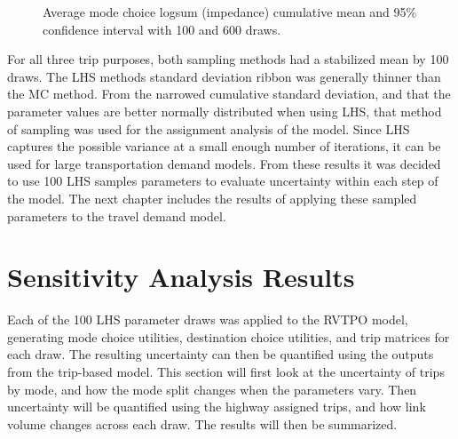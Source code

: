 \documentclass[
  futuretransp,
  submit,
  moreauthors,
]{Definitions/mdpi}
\begin{document}
\begin{figure}

\begin{minipage}{\linewidth}



\end{minipage}%
\newline
\begin{minipage}{\linewidth}



\end{minipage}%

\caption{\label{fig-cm}Average mode choice logsum (impedance) cumulative
mean and 95\% confidence interval with 100 and 600 draws.}

\end{figure}%

For all three trip purposes, both sampling methods had a stabilized mean
by 100 draws. The LHS methods standard deviation ribbon was generally
thinner than the MC method. From the narrowed cumulative standard
deviation, and that the parameter values are better normally distributed
when using LHS, that method of sampling was used for the assignment
analysis of the model. Since LHS captures the possible variance at a
small enough number of iterations, it can be used for large
transportation demand models. From these results it was decided to use
100 LHS samples parameters to evaluate uncertainty within each step of
the model. The next chapter includes the results of applying these
sampled parameters to the travel demand model.


\section{Sensitivity Analysis Results}\label{sec-results}

Each of the 100 LHS parameter draws was applied to the RVTPO model,
generating mode choice utilities, destination choice utilities, and trip
matrices for each draw. The resulting uncertainty can then be quantified
using the outputs from the trip-based model. This section will first
look at the uncertainty of trips by mode, and how the mode split changes
when the parameters vary. Then uncertainty will be quantified using the
highway assigned trips, and how link volume changes across each draw.
The results will then be summarized.
\end{document}
